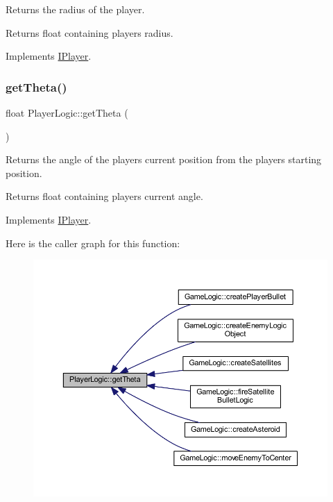 Returns the radius of the player. 

\begin{DoxyReturn}{Returns}
float containing players radius. 
\end{DoxyReturn}


Implements \hyperlink{class_i_player_a240460b3baeee74029f1fc407493d121}{I\+Player}.

\mbox{\label{class_player_logic_a7ea2f59ddde028b5451ddbe60453de1c}} 
\subsubsection{\texorpdfstring{get\+Theta()}{getTheta()}}
{\footnotesize\ttfamily float Player\+Logic\+::get\+Theta (\begin{DoxyParamCaption}{ }\end{DoxyParamCaption})\hspace{0.3cm}{\ttfamily [virtual]}}



Returns the angle of the player\textquotesingle{}s current position from the players starting position. 

\begin{DoxyReturn}{Returns}
float containing players current angle. 
\end{DoxyReturn}


Implements \hyperlink{class_i_player_a05103e6bebfd4230bab62d112c7e4eec}{I\+Player}.

Here is the caller graph for this function\+:
\nopagebreak
\begin{figure}[H]
\begin{center}
\leavevmode
\includegraphics[width=350pt]{class_player_logic_a7ea2f59ddde028b5451ddbe60453de1c_icgraph}
\end{center}
\end{figure}
\mbox{\label{class_player_logic_a9f92defe2d43690329bd6e334fb61e01}} 
